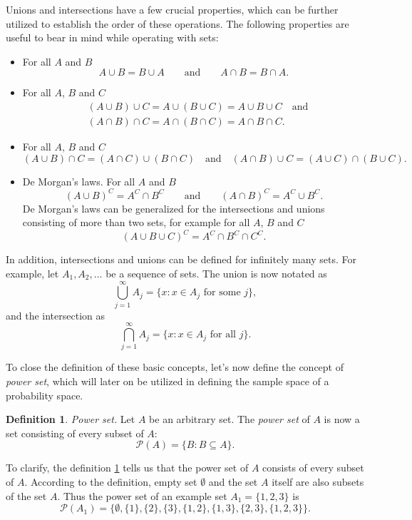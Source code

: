 \documentclass[12pt,a4paper,leqno]{report}
\theoremstyle{plain}
\theoremstyle{definition}
\newtheorem{maar}[equation]{Definition}
\begin{document}
\bigskip

Unions and intersections have a few crucial properties, which can be further utilized to establish the order of these operations. The following properties are useful to bear in mind while operating with sets:

\begin{itemize}
\item For all $A$ and $B$
\[
A \cup B = B \cup A \qquad \text{and} \qquad A \cap B = B \cap A.
\]
\item  For all $A$, $B$ and $C$
\[
\begin{split}
&(A \cup B) \cup C = A \cup (B \cup C) = A \cup B \cup C \quad \text{and}  \\
&(A \cap B) \cap C = A \cap (B \cap C) = A \cap B \cap C.
\end{split}
\]
\item For all $A$, $B$ and $C$ 
\[
(A \cup B) \cap C = (A \cap C) \cup (B \cap C)\quad \text{and} \quad (A \cap B) \cup C = (A \cup C) \cap (B \cup C).
\]
\item De Morgan's laws. For all $A$ and $B$
\[
(A \cup B)^C = A^C \cap B^C \qquad \text{and} \qquad (A \cap B)^C = A^C \cup B^C. 
\]
De Morgan's laws can be generalized for the intersections and unions consisting of more than two sets, for example for all $A$, $B$ and $C$
\[
(A \cup B \cup C)^C = A^C \cap B^C \cap C^C.
\]
\end{itemize}

\bigskip

In addition, intersections and unions can be defined for infinitely many sets. For example, let $A_1, A_2, \ldots$ be a sequence of sets. The union is now notated as
\[
\bigcup_{j = 1}^{\infty} A_j = \{x : x \in A_j \text{ for some } j\},
\]
and the intersection as 
\[
\bigcap_{j = 1}^{\infty} A_j = \{x : x \in A_j \text{ for all } j\}.
\]

\bigskip

To close the definition of these basic concepts, let's now define the concept of \emph{power set}, which will later on be utilized in defining the sample space of a probability space.


\begin{maar}\label{powerset}
\emph{Power set.} Let $A$ be an arbitrary set. The \emph{power set} of $A$ is now a set consisting of every subset of $A$:
\[
\mathcal{P}(A) = \{B : B \subseteq A \}.
\]
\end{maar}

To clarify, the definition \ref{powerset} tells us that the power set of $A$ consists of every subset of $A$. According to the definition, empty set $\emptyset$ and the set $A$ itself are also subsets of the set $A$. Thus the power set of an example set $A_1 = \{1, 2, 3\}$ is
\[\mathcal{P}(A_1) = \{\emptyset, \{1\}, \{2\}, \{3\}, \{1,2\}, \{1,3\}, \{2,3\}, \{1,2,3\}\}.
\]
\end{document}
